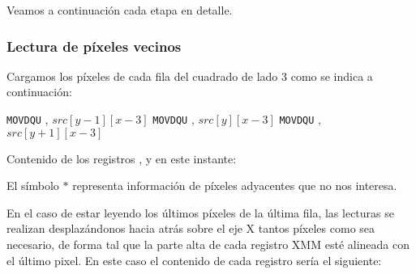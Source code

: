 Veamos a continuación cada etapa en detalle.




\subsubsection{Lectura de píxeles vecinos}

Cargamos los píxeles de cada fila del cuadrado de lado 3 como se indica a continuación:

\begin{algorithmic}
    \STATE \texttt{MOVDQU} , $src[y-1][x-3]$
    \STATE \texttt{MOVDQU} , $src[y][x-3]$
    \STATE \texttt{MOVDQU} , $src[y+1][x-3]$        
\end{algorithmic}

Contenido de los registros ,  y  en este instante:

\begin{center}
\end{center}

El símbolo $\ast$ representa información de píxeles adyacentes que no nos interesa.

En el caso de estar leyendo los últimos píxeles de la última fila, las lecturas
se realizan desplazándonos hacia atrás sobre el eje X tantos píxeles como sea
necesario, de forma tal que la parte alta de cada registro XMM esté alineada
con el último pixel. En este caso el contenido de cada registro sería
el siguiente:

\begin{center}
\end{center}

